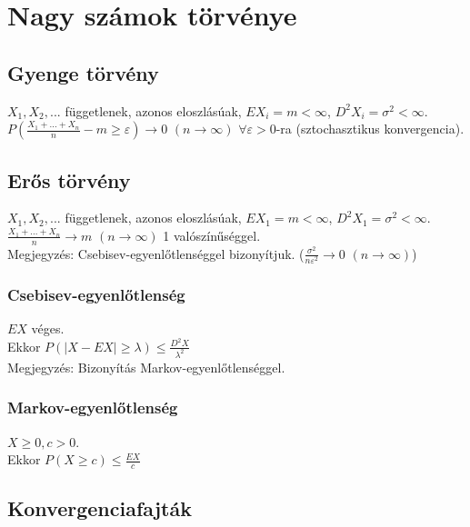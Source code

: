 \documentclass[margin=0px]{article}
\begin{document}
\section{Nagy számok törvénye}

\subsection{Gyenge törvény}

$X_1, X_2, ...$ függetlenek, azonos eloszlásúak, $EX_i = m < \infty$, $D^{2}X_i = \sigma^2 < \infty$. \\
$P(\frac{X_1 + ... + X_n}{n} - m \geq \varepsilon) \rightarrow 0$ $(n \to \infty)$ $\forall \varepsilon > 0$-ra (sztochasztikus konvergencia).

\subsection{Erős törvény}

$X_1, X_2, ...$ függetlenek, azonos eloszlásúak, $EX_1 = m < \infty$, $D^{2}X_1 = \sigma^2 < \infty$. \\
$\frac{X_1 + ... + X_n}{n} \rightarrow m$ $(n \to \infty)$ 1 valószínűséggel. \\
Megjegyzés: Csebisev-egyenlőtlenséggel bizonyítjuk. ($\frac{\sigma^2}{n \varepsilon^2} \to 0$ $(n \to \infty)$)

\subsubsection{Csebisev-egyenlőtlenség}

$EX$ véges. \\
Ekkor $P(|X-EX| \geq \lambda) \leq \frac{D^{2}X}{\lambda^2}$ \\
Megjegyzés: Bizonyítás Markov-egyenlőtlenséggel.

\subsubsection{Markov-egyenlőtlenség}

$X \geq 0, c > 0$. \\
Ekkor $P(X \geq c) \leq \frac{EX}{c}$

\subsection{Konvergenciafajták}
\end{document}
